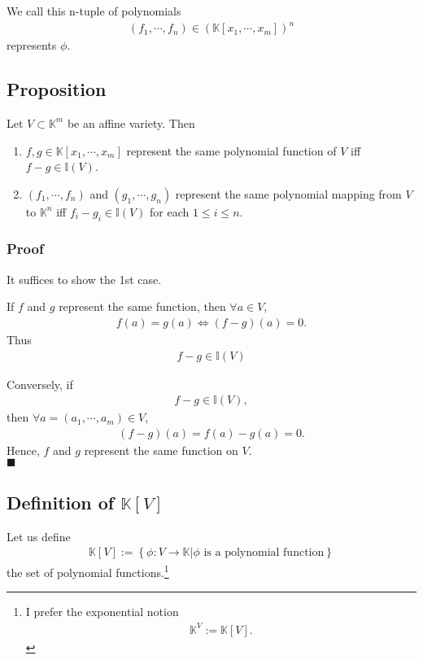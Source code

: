 \documentclass[11pt]{book}
\begin{document}
We call this n-tuple of polynomials
\begin{eqnarray}
(f_1, \cdots, f_n) \in \left( \mathbb{K}[x_1, \cdots, x_m] \right)^n
\end{eqnarray}
represents $\phi$.

\subsection{Proposition}
Let $V \subset \mathbb{K}^m$ be an affine variety.
Then
\begin{enumerate}
\item $f,g \in \mathbb{K}[x_1, \cdots, x_m]$ represent the same polynomial function of $V$ iff $f-g \in \mathbb{I}(V)$.

\item $(f_1, \cdots, f_n)$ and $(g_1, \cdots, g_n)$ represent the same polynomial mapping from $V$ to $\mathbb{K}^n$ iff $f_i - g_i \in \mathbb{I}(V)$ for each $1 \leq i \leq n$.
\end{enumerate}

\subsubsection{Proof}
It suffices to show the 1st case.

If $f$ and $g$ represent the same function, then $\forall a \in V$,
\begin{eqnarray}
f(a) = g(a) \Leftrightarrow (f - g)(a) = 0.
\end{eqnarray}
Thus 
\begin{eqnarray}
f - g \in \mathbb{I}(V)
\end{eqnarray}

Conversely, if
\begin{eqnarray}
f - g \in \mathbb{I}(V),
\end{eqnarray}
then $\forall a = (a_1, \cdots, a_m) \in V$,
\begin{eqnarray}
(f-g)(a) = f(a) - g(a) = 0.
\end{eqnarray}
Hence, $f$ and $g$ represent the same function on $V$.\\
$\blacksquare$

\subsection{Definition of $\mathbb{K}[V]$}
Let us define
\begin{eqnarray}
\mathbb{K}[V] := \left\{\phi : V \to \mathbb{K} \left| \phi \text{ is a polynomial function} \right. \right\}
\end{eqnarray}
the set of polynomial functions.\footnote{
I prefer the exponential notion
\begin{eqnarray}
\mathbb{K}^V := \mathbb{K}[V].
\end{eqnarray}
}
\end{document}
